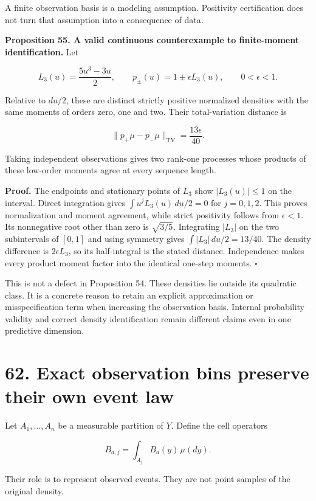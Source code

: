 \documentclass[11pt,letterpaper]{article}
\begin{document}
A finite observation basis is a modeling assumption. Positivity
certification does not turn that assumption into a consequence of data.

\textbf{Proposition 55. A valid continuous counterexample to
finite-moment identification.} Let

\[
L_3(u)=\frac{5u^3-3u}{2},\qquad
p_\pm(u)=1\pm\epsilon L_3(u),\qquad 0<\epsilon<1.
\]

Relative to \(du/2\), these are distinct strictly positive normalized
densities with the same moments of orders zero, one and two. Their
total-variation distance is

\[
\boxed{\|p_+\mu-p_-\mu\|_{\mathrm{TV}}=\frac{13\epsilon}{40}.}
\]

Taking independent observations gives two rank-one processes whose
products of these low-order moments agree at every sequence length.

\textbf{Proof.} The endpoints and stationary points of \(L_3\) show
\(|L_3(u)|\leq1\) on the interval. Direct integration gives
\(\int u^jL_3(u)\,du/2=0\) for \(j=0,1,2\). This proves normalization
and moment agreement, while strict positivity follows from
\(\epsilon<1\). Its nonnegative root other than zero is \(\sqrt{3/5}\).
Integrating \(|L_3|\) on the two subintervals of \([0,1]\) and using
symmetry gives \(\int|L_3|\,du/2=13/40\). The density difference is
\(2\epsilon L_3\), so its half-integral is the stated distance.
Independence makes every product moment factor into the identical
one-step moments. \(\square\)

This is not a defect in Proposition 54. These densities lie outside its
quadratic class. It is a concrete reason to retain an explicit
approximation or misspecification term when increasing the observation
basis. Internal probability validity and correct density identification
remain different claims even in one predictive dimension.

\section{62. Exact observation bins preserve their own event
law}\label{exact-observation-bins-preserve-their-own-event-law}

Let \(A_1,\ldots,A_n\) be a measurable partition of \(Y\). Define the
cell operators

\[
B_{a,j}=\int_{A_j}B_a(y)\,\mu(dy).
\]

Their role is to represent observed events. They are not point samples
of the original density.
\end{document}
